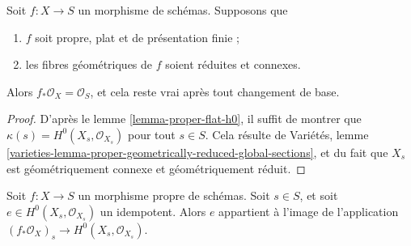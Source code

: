 \begin{lemma}
\label{lemma-proper-flat-geom-red-connected}
Soit $f : X \to S$ un morphisme de schémas. Supposons que
\begin{enumerate}
\item $f$ soit propre, plat et de présentation finie ;
\item les fibres géométriques de $f$ soient réduites et connexes.
\end{enumerate}
Alors $f_*\mathcal{O}_X = \mathcal{O}_S$, et cela reste vrai
après tout changement de base.
\end{lemma}

\begin{proof}
D'après le lemme \ref{lemma-proper-flat-h0},
il suffit de montrer que $\kappa(s) = H^0(X_s, \mathcal{O}_{X_s})$
pour tout $s \in S$. Cela résulte de
Variétés, lemme
\ref{varieties-lemma-proper-geometrically-reduced-global-sections},
et du fait que $X_s$ est géométriquement connexe et géométriquement réduit.
\end{proof}

\begin{lemma}
\label{lemma-proper-idempotent-on-fibre}
Soit $f : X \to S$ un morphisme propre de schémas. Soit $s \in S$,
et soit $e \in H^0(X_s, \mathcal{O}_{X_s})$ un idempotent.
Alors $e$ appartient à l'image de l'application
$(f_*\mathcal{O}_X)_s \to H^0(X_s, \mathcal{O}_{X_s})$.
\end{lemma}


